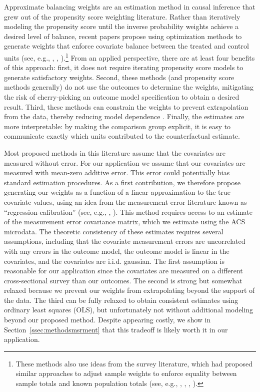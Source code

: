 \documentclass[aoas]{imsart}
\theoremstyle{plain}
\theoremstyle{remark}
\begin{document}
Approximate balancing weights are an estimation method in causal inference that grew out of the propensity score weighting literature. Rather than iteratively modeling the propensity score until the inverse probability weights achieve a desired level of balance, recent papers propose using optimization methods to generate weights that enforce covariate balance between the treated and control units (see, e.g., \citet{hainmueller2012entropy}, \citet{imai2014covariate}, \citet{zubizarreta2015stable}).\footnote{These methods also use ideas from the survey literature, which had proposed similar approaches to adjust sample weights to enforce equality between sample totals and known population totals (see, e.g., \citet{haberman1984adjustment}, \citet{deville1992calibration}, \citet{deville1993generalized}, \citet{sarndal2005estimation}).} From an applied perspective, there are at least four benefits of this approach: first, it does not require iterating propensity score models to generate satisfactory weights. Second, these methods (and propensity score methods generally) do not use the outcomes to determine the weights, mitigating the risk of cherry-picking an outcome model specification to obtain a desired result. Third, these methods can constrain the weights to prevent extrapolation from the data, thereby reducing model dependence \citep{zubizarreta2015stable}. Finally, the estimates are more interpretable: by making the comparison group explicit, it is easy to communicate exactly which units contributed to the counterfactual estimate.

Most proposed methods in this literature assume that the covariates are measured without error. For our application we assume that our covariates are measured with mean-zero additive error. This error could potentially bias standard estimation procedures. As a first contribution, we therefore propose generating our weights as a function of a linear approximation to the true covariate values, using an idea from the measurement error literature known as ``regression-calibration'' (see, e.g., \citet{gleser1992importance}, \citet{carroll2006measurement}). This method requires access to an estimate of the measurement error covariance matrix, which we estimate using the ACS microdata. The theoretic consistency of these estimates requires several assumptions, including that the covariate measurement errors are uncorrelated with any errors in the outcome model, the outcome model is linear in the covariates, and the covariates are i.i.d. gaussian. The first assumption is reasonable for our application since the covariates are measured on a different cross-sectional survey than our outcomes. The second is strong but somewhat relaxed because we prevent our weights from extrapolating beyond the support of the data. The third can be fully relaxed to obtain consistent estimates using ordinary least squares (OLS), but unfortunately not without additional modeling beyond our proposed method. Despite appearing costly, we show in Section~\ref{ssec:methodsmsrment} that this tradeoff is likely worth it in our application.
\end{document}

